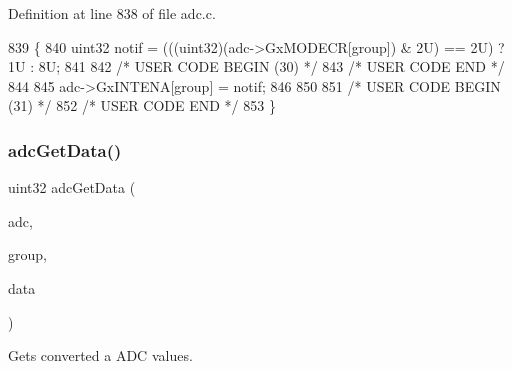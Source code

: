 Definition at line 838 of file adc.\+c.


\begin{DoxyCode}
839 \{
840     uint32 notif = (((uint32)(adc->GxMODECR[group]) & 2U) == 2U) ? 1U : 8U;
841 
842 \textcolor{comment}{/* USER CODE BEGIN (30) */}
843 \textcolor{comment}{/* USER CODE END */}
844 
845     adc->GxINTENA[group] = notif;
846 
850 
851 \textcolor{comment}{/* USER CODE BEGIN (31) */}
852 \textcolor{comment}{/* USER CODE END */}
853 \}
\end{DoxyCode}
\mbox{\label{group__ADC_gac756b9d0f3fc77b1ad5336442895d00f}} 
\subsubsection{\texorpdfstring{adc\+Get\+Data()}{adcGetData()}}
{\footnotesize\ttfamily uint32 adc\+Get\+Data (\begin{DoxyParamCaption}\item[{\mbox{\hyperlink{reg__adc_8h_ab98b3b090eb1fd96596cd337a5fc0a4e}{adc\+B\+A\+S\+E\+\_\+t}} $\ast$}]{adc,  }\item[{uint32}]{group,  }\item[{\mbox{\hyperlink{adc_8h_afee29ee48ab2e8c8be88a9955d37d6b9}{adc\+Data\+\_\+t}} $\ast$}]{data }\end{DoxyParamCaption})}



Gets converted a A\+DC values. 


